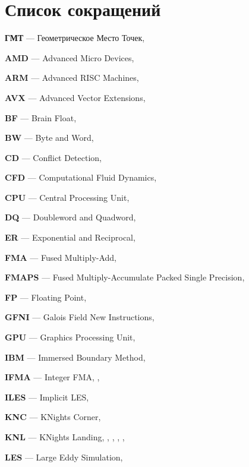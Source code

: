 \newpage

\section*{Список сокращений}

\textbf{ГМТ} --- Геометрическое Место Точек, \pageref{abbr:gmt}

\textbf{AMD} --- Advanced Micro Devices, \pageref{abbr:amd}

\textbf{ARM} --- Advanced RISC Machines, \pageref{abbr:arm}

\textbf{AVX} --- Advanced Vector Extensions, \pageref{abbr:avx}

\textbf{BF} --- Brain Float, \pageref{abbr:bf}

\textbf{BW} --- Byte and Word, \pageref{abbr:bw}

\textbf{CD} --- Conflict Detection, \pageref{abbr:cd}

\textbf{CFD} --- Computational Fluid Dynamics, \pageref{abbr:cfd}

\textbf{CPU} --- Central Processing Unit, \pageref{abbr:cpu}

\textbf{DQ} --- Doubleword and Quadword, \pageref{abbr:dq}

\textbf{ER} --- Exponential and Reciprocal, \pageref{abbr:er}

\textbf{FMA} --- Fused Multiply-Add, \pageref{abbr:fma}

\textbf{FMAPS} --- Fused Multiply-Accumulate Packed Single Precision, \pageref{abbr:fmaps}
 
\textbf{FP} --- Floating Point, \pageref{abbr:fp}

\textbf{GFNI} --- Galois Field New Instructions, \pageref{abbr:gfni}

\textbf{GPU} --- Graphics Processing Unit, \pageref{abbr:gpu}

\textbf{IBM} --- Immersed Boundary Method, \pageref{abbr:ibm}

\textbf{IFMA} --- Integer FMA, \pageref{abbr:ifma}, \pageref{abbr:ifma2}

\textbf{ILES} --- Implicit LES, \pageref{abbr:iles}

\textbf{KNC} --- KNights Corner, \pageref{abbr:knc}

\textbf{KNL} --- KNights Landing, \pageref{abbr:knl}, \pageref{abbr:knl2}, \pageref{abbr:knl3}, \pageref{abbr:knl4}, \pageref{abbr:knl5}

\textbf{LES} --- Large Eddy Simulation, \pageref{abbr:les}

